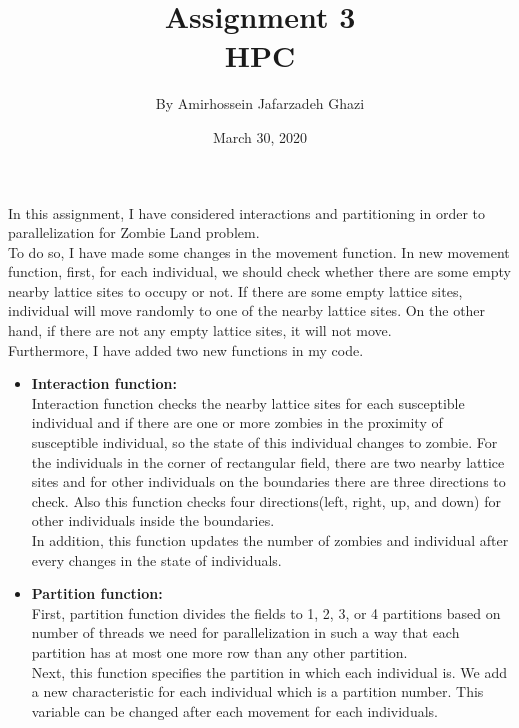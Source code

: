 \documentclass[12pt]{article}
\title{Assignment 3\\HPC}
\author{By Amirhossein Jafarzadeh Ghazi}
\date{March 30, 2020}
\begin{document}
\begin{titlepage}
\maketitle
\end{titlepage}
\hfill \break

In this assignment, I have considered interactions and partitioning in order to parallelization for Zombie Land problem.\\
To do so, I have made some changes in the movement function. In new movement function, first, for each individual, we should check whether there are some empty nearby lattice sites to occupy or not. If there are some empty lattice sites, individual will move randomly to one of the nearby lattice sites. On the other hand, if there are not any empty lattice sites, it will not move.\\
Furthermore, I have added two new functions in my code.\\
\begin{itemize}
\item \textbf{Interaction function:}\\
Interaction function checks the nearby lattice sites for each susceptible individual and if there are one or more zombies in the proximity of susceptible individual, so the state of this individual changes to zombie. For the individuals in the corner of rectangular field, there are two nearby lattice sites and for other individuals on the boundaries there are three directions to check. Also this function checks four directions(left, right, up, and down) for other individuals inside the boundaries.\\
In addition, this function updates the number of zombies and individual after every changes in the state of individuals.

\item \textbf{Partition function:}\\
First, partition function divides the fields to 1, 2, 3, or 4 partitions based on number of threads we need for parallelization in such a way that each partition has at most one more row than any other partition.\\
Next, this function specifies the partition in which each individual is. We add a new characteristic for each individual which is a partition number. This variable can be changed after each movement for each individuals.
\\
\end{itemize}
\end{document}
